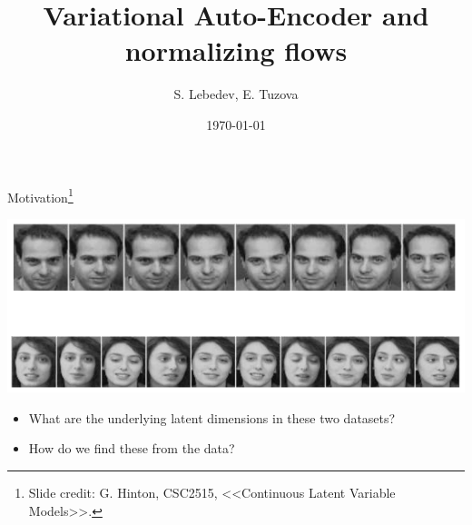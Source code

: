 \documentclass[unicode,11pt]{beamer}
\title{Variational Auto-Encoder and normalizing flows}
\author{S. Lebedev, E. Tuzova}
\institute{JetBrains}
\date{\today}
\begin{document}
\begin{frame}
  \maketitle
\end{frame}


\begin{frame}{Motivation\footnote{Slide credit: G. Hinton, CSC2515, <<Continuous
      Latent Variable Models>>.}}
  \begin{center}
    \includegraphics[width=.8\textwidth]{images/motivation}
  \end{center}

  \begin{itemize}
  \item What are the underlying latent dimensions in these two datasets?
  \item How do we find these from the data?
  \end{itemize}
\end{frame}
\end{document}
